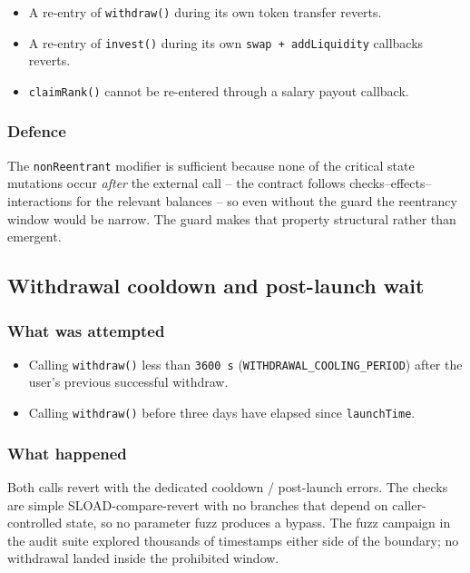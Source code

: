 \documentclass[11pt,a4paper]{article}
\begin{document}
\begin{itemize}[leftmargin=*]
    \item A re-entry of \texttt{withdraw()} during its own token transfer
          reverts.
    \item A re-entry of \texttt{invest()} during its own \texttt{swap +
          addLiquidity} callbacks reverts.
    \item \texttt{claimRank()} cannot be re-entered through a salary payout
          callback.
\end{itemize}

\subsubsection*{Defence}

The \texttt{nonReentrant} modifier is sufficient because none of the
critical state mutations occur \emph{after} the external call -- the
contract follows checks--effects--interactions for the relevant balances --
so even without the guard the reentrancy window would be narrow. The guard
makes that property structural rather than emergent.

\subsection{Withdrawal cooldown and post-launch wait}

\subsubsection*{What was attempted}

\begin{itemize}[leftmargin=*]
    \item Calling \texttt{withdraw()} less than \texttt{3600 s}
          (\texttt{WITHDRAWAL\_COOLING\_PERIOD}) after the user's previous
          successful withdraw.
    \item Calling \texttt{withdraw()} before three days have elapsed since
          \texttt{launchTime}.
\end{itemize}

\subsubsection*{What happened}

Both calls revert with the dedicated cooldown / post-launch errors. The
checks are simple SLOAD-compare-revert with no branches that depend on
caller-controlled state, so no parameter fuzz produces a bypass. The fuzz
campaign in the audit suite explored thousands of timestamps either side of
the boundary; no withdrawal landed inside the prohibited window.
\end{document}
